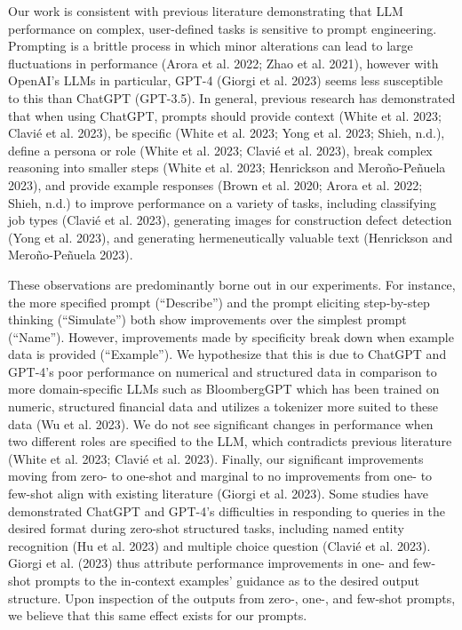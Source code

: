 \documentclass[
  letterpaper,
  DIV=11,
  numbers=noendperiod]{scrartcl}
\begin{document}
Our work is consistent with previous literature demonstrating that LLM
performance on complex, user-defined tasks is sensitive to prompt
engineering. Prompting is a brittle process in which minor alterations
can lead to large fluctuations in performance (Arora et al. 2022; Zhao
et al. 2021), however with OpenAI's LLMs in particular, GPT-4 (Giorgi et
al. 2023) seems less susceptible to this than ChatGPT (GPT-3.5). In
general, previous research has demonstrated that when using ChatGPT,
prompts should provide context (White et al. 2023; Clavié et al. 2023),
be specific (White et al. 2023; Yong et al. 2023; Shieh, n.d.), define a
persona or role (White et al. 2023; Clavié et al. 2023), break complex
reasoning into smaller steps (White et al. 2023; Henrickson and
Meroño-Peñuela 2023), and provide example responses (Brown et al. 2020;
Arora et al. 2022; Shieh, n.d.) to improve performance on a variety of
tasks, including classifying job types (Clavié et al. 2023), generating
images for construction defect detection (Yong et al. 2023), and
generating hermeneutically valuable text (Henrickson and Meroño-Peñuela
2023).

These observations are predominantly borne out in our experiments. For
instance, the more specified prompt (``Describe'') and the prompt
eliciting step-by-step thinking (``Simulate'') both show improvements
over the simplest prompt (``Name''). However, improvements made by
specificity break down when example data is provided (``Example''). We
hypothesize that this is due to ChatGPT and GPT-4's poor performance on
numerical and structured data in comparison to more domain-specific LLMs
such as BloombergGPT which has been trained on numeric, structured
financial data and utilizes a tokenizer more suited to these data (Wu et
al. 2023). We do not see significant changes in performance when two
different roles are specified to the LLM, which contradicts previous
literature (White et al. 2023; Clavié et al. 2023). Finally, our
significant improvements moving from zero- to one-shot and marginal to
no improvements from one- to few-shot align with existing literature
(Giorgi et al. 2023). Some studies have demonstrated ChatGPT and GPT-4's
difficulties in responding to queries in the desired format during
zero-shot structured tasks, including named entity recognition (Hu et
al. 2023) and multiple choice question (Clavié et al. 2023). Giorgi et
al. (2023) thus attribute performance improvements in one- and few-shot
prompts to the in-context examples' guidance as to the desired output
structure. Upon inspection of the outputs from zero-, one-, and few-shot
prompts, we believe that this same effect exists for our prompts.
\end{document}
